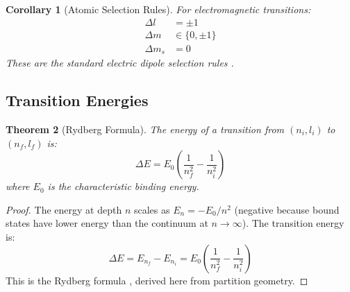 \documentclass[twocolumn,10pt,a4paper]{article}
\newtheorem{theorem}{Theorem}[section]
\newtheorem{corollary}[theorem]{Corollary}
\theoremstyle{definition}
\theoremstyle{remark}
\begin{document}
\begin{corollary}[Atomic Selection Rules]
For electromagnetic transitions:
\begin{align}
    \Delta l &= \pm 1 \\
    \Delta m &\in \{0, \pm 1\} \\
    \Delta m_s &= 0
\end{align}
These are the standard electric dipole selection rules \cite{condon1935}.
\end{corollary}

\subsection{Transition Energies}

\begin{theorem}[Rydberg Formula]
\label{thm:rydberg}
The energy of a transition from $(n_i, l_i)$ to $(n_f, l_f)$ is:
\begin{equation}
    \Delta E = E_0 \left( \frac{1}{n_f^2} - \frac{1}{n_i^2} \right)
\end{equation}
where $E_0$ is the characteristic binding energy.
\end{theorem}

\begin{proof}
The energy at depth $n$ scales as $E_n = -E_0/n^2$ (negative because bound states have lower energy than the continuum at $n \to \infty$). The transition energy is:
\begin{equation}
    \Delta E = E_{n_f} - E_{n_i} = E_0 \left( \frac{1}{n_f^2} - \frac{1}{n_i^2} \right)
\end{equation}
This is the Rydberg formula \cite{rydberg1890}, derived here from partition geometry.
\end{proof}
\end{document}
